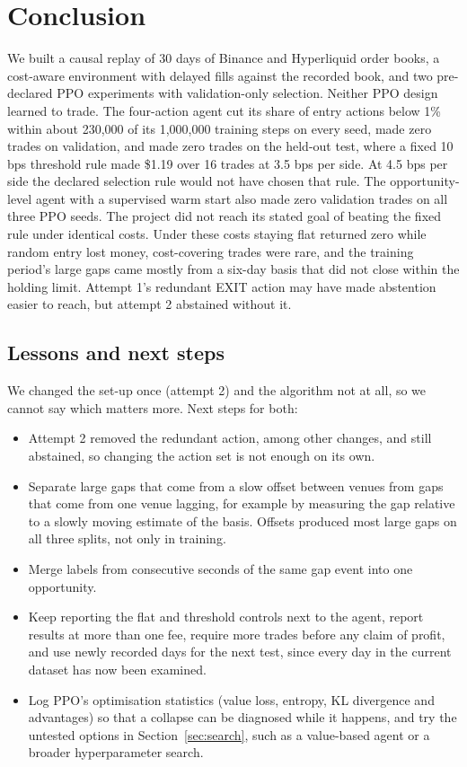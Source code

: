 \documentclass[12pt,a4paper]{article}
\DeclareRobustCommand{\bps}{\ifmmode\,\text{bps}\else\,bps\fi}
\begin{document}
\section{Conclusion}\label{sec:conclusion}

We built a causal replay of 30 days of Binance and Hyperliquid order books, a cost-aware
environment with delayed fills against the recorded book, and two pre-declared PPO
experiments with validation-only selection. Neither PPO design learned to trade. The
four-action agent cut its share of entry actions below 1\% within about 230,000 of its
1,000,000 training steps on every seed, made zero trades on validation, and made zero trades
on the held-out test, where a fixed 10\bps{} threshold rule made \$1.19 over 16 trades at
3.5\bps{} per side. At 4.5\bps{} per side the declared selection rule would not have chosen
that rule. The opportunity-level agent with a supervised warm start also made zero
validation trades on all three PPO seeds. The project did not reach its stated goal of
beating the fixed rule under identical costs. Under these costs staying flat returned zero
while random entry lost money, cost-covering trades were rare, and the training period's
large gaps came mostly from a six-day basis that did not close within the holding limit.
Attempt 1's redundant EXIT action may have made abstention easier to reach, but attempt 2
abstained without it.

\subsection*{Lessons and next steps}
We changed the set-up once (attempt 2) and the algorithm not at all, so we cannot say which
matters more. Next steps for both:
\begin{itemize}
\item Attempt 2 removed the redundant action, among other changes, and still abstained, so
changing the action set is not enough on its own.
\item Separate large gaps that come from a slow offset between venues from gaps that come
from one venue lagging, for example by measuring the gap relative to a slowly moving
estimate of the basis. Offsets produced most large gaps on all three splits, not only in
training.
\item Merge labels from consecutive seconds of the same gap event into one opportunity.
\item Keep reporting the flat and threshold controls next to the agent, report results at
more than one fee, require more trades before any claim of profit, and use newly recorded
days for the next test, since every day in the current dataset has now been examined.
\item Log PPO's optimisation statistics (value loss, entropy, KL divergence and advantages)
so that a collapse can be diagnosed while it happens, and try the untested options in
Section~\ref{sec:search}, such as a value-based agent or a broader hyperparameter search.
\end{itemize}
\end{document}
